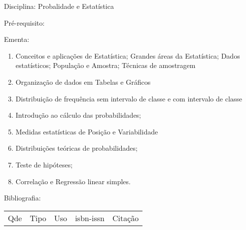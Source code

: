 \documentclass[12pt,a4paper,twoside]{report}
\begin{document}
Disciplina: Probalidade e Estatística

Pré-requisito:
\begin{enumerate}
\end{enumerate}

Ementa:
\begin{enumerate}
\item Conceitos e aplicações de Estatística; Grandes áreas da Estatística; Dados estatísticos; População e Amostra; Técnicas de amostragem
\item Organização de dados em Tabelas e Gráficos
\item Distribuição de frequência sem intervalo de classe e com intervalo de classe
\item Introdução ao cálculo das probabilidades;
\item Medidas estatísticas de Posição e Variabilidade
\item Distribuições teóricas de probabilidades;
\item Teste de hipóteses;
\item Correlação e Regressão linear simples.
\end{enumerate}

Bibliografia:
\begin{tabular}{lllll}
Qde & Tipo & Uso & isbn-issn & Citação \\
\end{tabular}
\end{document}
